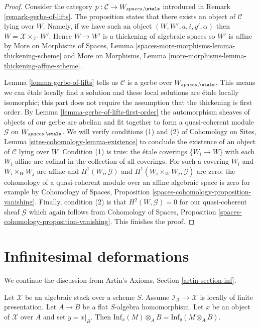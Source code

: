 \begin{proof}
Consider the category $p : \mathcal{C} \to W_{spaces, \etale}$
introduced in Remark \ref{remark-gerbe-of-lifts}.
The proposition states that there exists an object of $\mathcal{C}$
lying over $W$. Namely, if we have such an object
$(W, W', a, i, y', \alpha)$ then $W = \mathcal{X} \times_{\mathcal{X}'} W'$.
Hence $W \to W'$ is a thickening of algebraic spaces so
$W'$ is affine by
More on Morphisms of Spaces, Lemma
\ref{spaces-more-morphisms-lemma-thickening-scheme}
and More on Morphisms, Lemma
\ref{more-morphisms-lemma-thickening-affine-scheme}.

\medskip\noindent
Lemma \ref{lemma-gerbe-of-lifts} tells us $\mathcal{C}$ is a gerbe over
$W_{spaces, \etale}$. This means we can \'etale locally find a solution and
these local solutions are \'etale locally isomorphic;
this part does not require the assumption that the thickening is first order.
By Lemma \ref{lemma-gerbe-of-lifts-first-order}
the automorphism sheaves of objects of our gerbe are abelian and
fit together to form a quasi-coherent module $\mathcal{G}$
on $W_{spaces, \etale}$. We will verify conditions (1) and (2)
of Cohomology on Sites, Lemma \ref{sites-cohomology-lemma-existence}
to conclude the existence of an object of $\mathcal{C}$ lying over $W$.
Condition (1) is true: the \'etale coverings $\{W_i \to W\}$
with each $W_i$ affine are cofinal in the collection of all coverings.
For such a covering $W_i$ and $W_i \times_W W_j$ are affine
and $H^1(W_i, \mathcal{G})$ and $H^1(W_i \times_W W_j, \mathcal{G})$
are zero: the cohomology of a quasi-coherent module over an affine
algebraic space is zero for example by Cohomology of Spaces, Proposition
\ref{spaces-cohomology-proposition-vanishing}.
Finally, condition (2) is that $H^2(W, \mathcal{G}) = 0$
for our quasi-coherent sheaf $\mathcal{G}$ which again follows
from Cohomology of Spaces, Proposition
\ref{spaces-cohomology-proposition-vanishing}.
This finishes the proof.
\end{proof}






\section{Infinitesimal deformations}
\label{section-inf}

\noindent
We continue the discussion from
Artin's Axioms, Section \ref{artin-section-inf}.

\begin{lemma}
\label{lemma-inf-quasi-coherent}
Let $\mathcal{X}$ be an algebraic stack over a scheme $S$.
Assume $\mathcal{I}_\mathcal{X} \to \mathcal{X}$ is locally
of finite presentation. Let $A \to B$ be a flat $S$-algebra homomorphism.
Let $x$ be an object of $\mathcal{X}$ over $A$ and set $y = x|_B$.
Then $\text{Inf}_x(M) \otimes_A B = \text{Inf}_y(M \otimes_A B)$.
\end{lemma}

